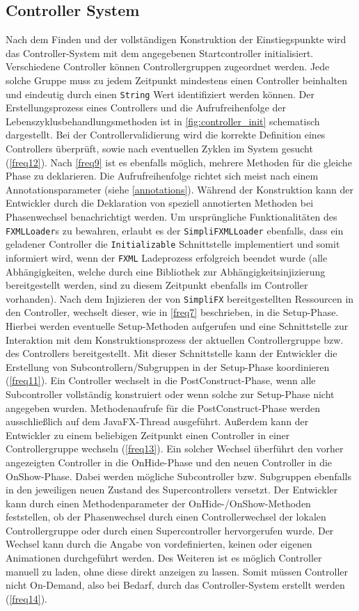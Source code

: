 \subsection{Controller System}
Nach dem Finden und der vollständigen Konstruktion der Einstiegspunkte wird das Controller-System mit dem angegebenen Startcontroller initialisiert. Verschiedene Controller können Controllergruppen zugeordnet werden. Jede solche Gruppe muss zu jedem Zeitpunkt mindestens einen Controller beinhalten und eindeutig durch einen \texttt{String} Wert identifiziert werden können. Der Erstellungsprozess eines Controllers und die Aufrufreihenfolge der Lebenszyklusbehandlungsmethoden ist in \autoref{fig:controller_init} schematisch dargestellt. Bei der Controllervalidierung wird die korrekte Definition eines Controllers überprüft, sowie nach eventuellen Zyklen im System gesucht (\autoref{freq12}). Nach \autoref{freq9} ist es ebenfalls möglich, mehrere Methoden für die gleiche Phase zu deklarieren. Die Aufrufreihenfolge richtet sich meist nach einem Annotationsparameter (siehe \autoref{annotations}). Während der Konstruktion kann der Entwickler durch die Deklaration von speziell annotierten Methoden bei Phasenwechsel benachrichtigt werden. Um ursprüngliche Funktionalitäten des \texttt{FXMLLoader}s zu bewahren, erlaubt es der \texttt{SimpliFXMLLoader} ebenfalls, dass ein geladener Controller die \texttt{Initializable} Schnittstelle implementiert und somit informiert wird, wenn der \texttt{FXML} Ladeprozess erfolgreich beendet wurde (alle Abhängigkeiten, welche durch eine Bibliothek zur Abhängigkeitsinjizierung bereitgestellt werden, sind zu diesem Zeitpunkt ebenfalls im Controller vorhanden). Nach dem Injizieren der von \texttt{SimpliFX} bereitgestellten Ressourcen in den Controller, wechselt dieser, wie in \autoref{freq7} beschrieben, in die Setup-Phase. Hierbei werden eventuelle Setup-Methoden aufgerufen und eine Schnittstelle zur Interaktion mit dem Konstruktionsprozess der aktuellen Controllergruppe bzw. des Controllers bereitgestellt. Mit dieser Schnittstelle kann der Entwickler die Erstellung von Subcontrollern/Subgruppen in der Setup-Phase koordinieren (\autoref{freq11}). Ein Controller wechselt in die PostConstruct-Phase, wenn alle Subcontroller vollständig konstruiert oder wenn solche zur Setup-Phase nicht angegeben wurden. Methodenaufrufe für die PostConstruct-Phase werden ausschließlich auf dem JavaFX-Thread ausgeführt. Außerdem kann der Entwickler zu einem beliebigen Zeitpunkt einen Controller in einer Controllergruppe wechseln (\autoref{freq13}). Ein solcher Wechsel überführt den vorher angezeigten Controller in die OnHide-Phase und den neuen Controller in die OnShow-Phase. Dabei werden mögliche Subcontroller bzw. Subgruppen ebenfalls in den jeweiligen neuen Zustand des Supercontrollers versetzt. Der Entwickler kann durch einen Methodenparameter der OnHide-/OnShow-Methoden feststellen, ob der Phasenwechsel durch einen Controllerwechsel der lokalen Controllergruppe oder durch einen Supercontroller hervorgerufen wurde. Der Wechsel kann durch die Angabe von vordefinierten, keinen oder eigenen Animationen durchgeführt werden. Des Weiteren ist es möglich Controller manuell zu laden, ohne diese direkt anzeigen zu lassen. Somit müssen Controller nicht On-Demand, also bei Bedarf, durch das Controller-System erstellt werden (\autoref{freq14}).
